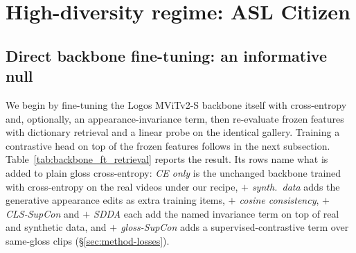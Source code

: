 \section{High-diversity regime: ASL Citizen}
\label{sec:results-highdiv}

\subsection{Direct backbone fine-tuning: an informative null}
We begin by fine-tuning the Logos MViTv2-S
backbone itself with cross-entropy and, optionally, an appearance-invariance
term, then re-evaluate frozen features
with dictionary retrieval and a linear probe on the identical gallery.
Training a
contrastive head on top of the frozen features follows in the next
subsection.
Table~\ref{tab:backbone_ft_retrieval} reports the result. Its rows name what
is added to plain gloss cross-entropy: \emph{CE only} is the unchanged
backbone trained with cross-entropy on the real videos under our recipe,
\emph{$+$ synth.\ data} adds the generative appearance edits as extra training items,
\emph{$+$ cosine consistency}, \emph{$+$ CLS-SupCon} and \emph{$+$ SDDA}
each add the named invariance term on top of real and synthetic data,
and \emph{$+$ gloss-SupCon} adds a supervised-contrastive term over
same-gloss clips (\S\ref{sec:method-losses}).

